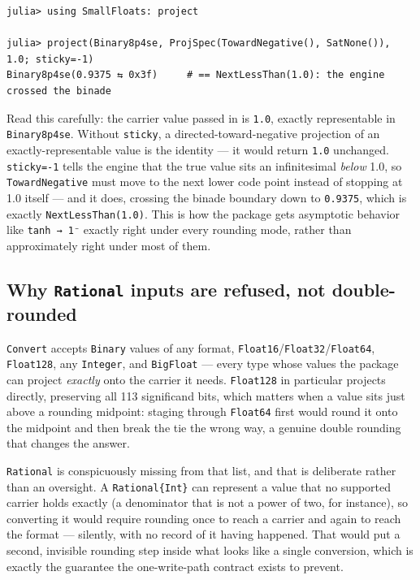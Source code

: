 \nopagebreak[4]
\begin{verbatim}
julia> using SmallFloats: project

julia> project(Binary8p4se, ProjSpec(TowardNegative(), SatNone()), 1.0; sticky=-1)
Binary8p4se(0.9375 ⇆ 0x3f)     # == NextLessThan(1.0): the engine crossed the binade
\end{verbatim}



Read this carefully: the carrier value passed in is \texttt{1.0}, exactly representable in \texttt{Binary8p4se}. Without \texttt{sticky}, a directed-toward-negative projection of an exactly-representable value is the identity — it would return \texttt{1.0} unchanged. \texttt{sticky=-1} tells the engine that the true value sits an infinitesimal \emph{below} 1.0, so \texttt{TowardNegative} must move to the next lower code point instead of stopping at 1.0 itself — and it does, crossing the binade boundary down to \texttt{0.9375}, which is exactly \texttt{NextLessThan(1.0)}. This is how the package gets asymptotic behavior like \texttt{tanh → 1⁻} exactly right under every rounding mode, rather than approximately right under most of them.



\subsection{Why \texttt{Rational} inputs are refused, not double-rounded}



\label{16856155639614633457}{}


\texttt{Convert} accepts \texttt{Binary} values of any format, \texttt{Float16}/\allowbreak\texttt{Float32}/\texttt{Float64}, \texttt{Float128}, any \texttt{Integer}, and \texttt{BigFloat} — every type whose values the package can project \emph{exactly} onto the carrier it needs. \texttt{Float128} in particular projects directly, preserving all 113 significand bits, which matters when a value sits just above a rounding midpoint: staging through \texttt{Float64} first would round it onto the midpoint and then break the tie the wrong way, a genuine double rounding that changes the answer.



\texttt{Rational} is conspicuously missing from that list, and that is deliberate rather than an oversight. A \texttt{Rational\{Int\}} can represent a value that no supported carrier holds exactly (a denominator that is not a power of two, for instance), so converting it would require rounding once to reach a carrier and again to reach the format — silently, with no record of it having happened. That would put a second, invisible rounding step inside what looks like a single conversion, which is exactly the guarantee the one-write-path contract exists to prevent.



